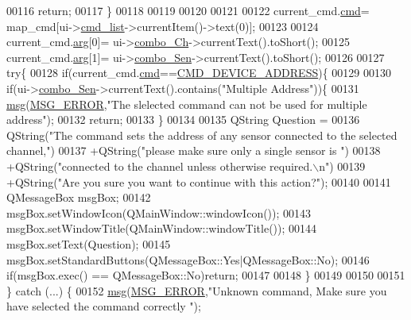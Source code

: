 \begin{DoxyCode}
00116         \textcolor{keywordflow}{return};
00117     \}
00118 
00119 
00120 
00121 
00122     current\_cmd.\hyperlink{a00001_af20664dc9ca2b752c73d524edee0e07a}{cmd}= map\_cmd[ui->\hyperlink{a00027_aa66ece71395b435e915d384fb63bac1d}{cmd\_list}->currentItem()->text(0)];
00123 
00124     current\_cmd.\hyperlink{a00001_a56e6c2d7315d0ae60a51e8b140c9cfe4}{arg}[0]= ui->\hyperlink{a00027_a263fb43f2eff37a44ff7359ba41e2eeb}{combo\_Ch}->currentText().toShort();
00125     current\_cmd.\hyperlink{a00001_a56e6c2d7315d0ae60a51e8b140c9cfe4}{arg}[1]= ui->\hyperlink{a00027_ad95005b5fcac8126171019298147b285}{combo\_Sen}->currentText().toShort();
00126 
00127     \textcolor{keywordflow}{try}\{
00128        \textcolor{keywordflow}{if}(current\_cmd.\hyperlink{a00001_af20664dc9ca2b752c73d524edee0e07a}{cmd}==\hyperlink{a00031_a7c6a5f4023cb02d02f2ded23147be425}{CMD\_DEVICE\_ADDRESS})\{
00129 
00130            \textcolor{keywordflow}{if}(ui->\hyperlink{a00027_ad95005b5fcac8126171019298147b285}{combo\_Sen}->currentText().contains(\textcolor{stringliteral}{"Multiple Address"}))\{
00131                \hyperlink{a00006_a6134b74dbfffbaf333e169bd09597b53}{msg}(\hyperlink{a00034_aa8a990825a5a62c89d2fb8b08d8a1070}{MSG\_ERROR},\textcolor{stringliteral}{"The slelected command can not be used for multiple address"});
00132                \textcolor{keywordflow}{return};
00133            \}
00134 
00135            QString Question =
00136                    QString(\textcolor{stringliteral}{"The command sets the address of any sensor connected to the selected channel,"})
00137                    +QString(\textcolor{stringliteral}{"please make sure only a single sensor is "})
00138                    +QString(\textcolor{stringliteral}{"connected to the channel unless otherwise required.\(\backslash\)n"})
00139                    +QString(\textcolor{stringliteral}{"Are you sure you want to continue with this action?"});
00140 
00141            QMessageBox msgBox;
00142            msgBox.setWindowIcon(QMainWindow::windowIcon());
00143            msgBox.setWindowTitle(QMainWindow::windowTitle());
00144            msgBox.setText(Question);
00145            msgBox.setStandardButtons(QMessageBox::Yes|QMessageBox::No);
00146            \textcolor{keywordflow}{if}(msgBox.exec() == QMessageBox::No)\textcolor{keywordflow}{return};
00147 
00148        \}
00149 
00150 
00151    \} \textcolor{keywordflow}{catch} (...) \{
00152         \hyperlink{a00006_a6134b74dbfffbaf333e169bd09597b53}{msg}(\hyperlink{a00034_aa8a990825a5a62c89d2fb8b08d8a1070}{MSG\_ERROR},\textcolor{stringliteral}{"Unknown command, Make sure you have selected the command correctly "});

\end{DoxyCode}
